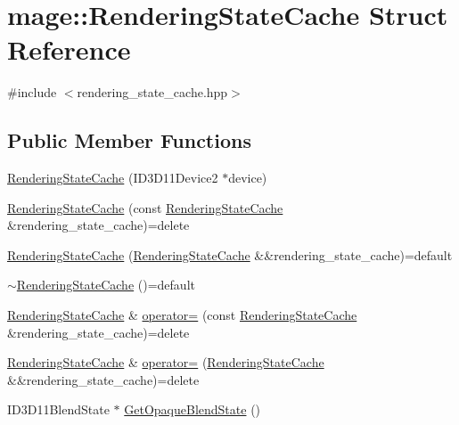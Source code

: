 \hypertarget{structmage_1_1_rendering_state_cache}{}\section{mage\+:\+:Rendering\+State\+Cache Struct Reference}
\label{structmage_1_1_rendering_state_cache}


{\ttfamily \#include $<$rendering\+\_\+state\+\_\+cache.\+hpp$>$}

\subsection*{Public Member Functions}
\begin{DoxyCompactItemize}
\item 
\hyperlink{structmage_1_1_rendering_state_cache_ad818eaa6c950c5851d6e684b9a4b3a65}{Rendering\+State\+Cache} (I\+D3\+D11\+Device2 $\ast$device)
\item 
\hyperlink{structmage_1_1_rendering_state_cache_a47c0f5527ce10ca9b6a059946efda239}{Rendering\+State\+Cache} (const \hyperlink{structmage_1_1_rendering_state_cache}{Rendering\+State\+Cache} \&rendering\+\_\+state\+\_\+cache)=delete
\item 
\hyperlink{structmage_1_1_rendering_state_cache_a0dc740c68de89418188392e9425df5e7}{Rendering\+State\+Cache} (\hyperlink{structmage_1_1_rendering_state_cache}{Rendering\+State\+Cache} \&\&rendering\+\_\+state\+\_\+cache)=default
\item 
\hyperlink{structmage_1_1_rendering_state_cache_a11b1c323310168153a60f5afef7def8d}{$\sim$\+Rendering\+State\+Cache} ()=default
\item 
\hyperlink{structmage_1_1_rendering_state_cache}{Rendering\+State\+Cache} \& \hyperlink{structmage_1_1_rendering_state_cache_a9534ceabde1d3f9f318f90d2ceec7646}{operator=} (const \hyperlink{structmage_1_1_rendering_state_cache}{Rendering\+State\+Cache} \&rendering\+\_\+state\+\_\+cache)=delete
\item 
\hyperlink{structmage_1_1_rendering_state_cache}{Rendering\+State\+Cache} \& \hyperlink{structmage_1_1_rendering_state_cache_aac885d9a83e196299ac896b3847f471b}{operator=} (\hyperlink{structmage_1_1_rendering_state_cache}{Rendering\+State\+Cache} \&\&rendering\+\_\+state\+\_\+cache)=delete
\item 
I\+D3\+D11\+Blend\+State $\ast$ \hyperlink{structmage_1_1_rendering_state_cache_a7208ccd74aa075e5283ad91d0efdf455}{Get\+Opaque\+Blend\+State} ()
\item 

\end{DoxyCompactItemize}
